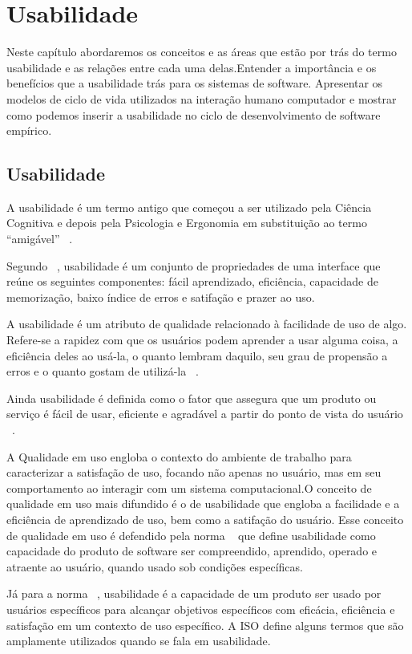 \chapter{Usabilidade}

	Neste capítulo abordaremos os conceitos e as áreas que estão por trás do termo usabilidade e as relações entre cada uma delas.Entender a importância e os benefícios que a usabilidade trás para os sistemas de software. Apresentar os modelos de ciclo de vida utilizados na interação humano computador e mostrar como podemos inserir a usabilidade no ciclo de desenvolvimento de software empírico.

\section {Usabilidade}

	A usabilidade é um termo antigo que começou a ser utilizado pela Ciência Cognitiva e depois pela Psicologia e Ergonomia em substituição ao termo “amigável” ~\cite{dias2006}.
	
	Segundo ~, usabilidade é um conjunto de propriedades de uma interface que reúne os seguintes componentes: fácil aprendizado, eficiência, capacidade de memorização, baixo índice de erros e satifação e prazer ao uso.

	A usabilidade é um atributo de qualidade relacionado à facilidade de uso de algo. Refere-se a rapidez com que os usuários podem aprender a usar alguma coisa, a eficiência deles ao usá-la, o quanto lembram daquilo, seu grau de propensão a erros e o quanto gostam de utilizá-la ~\cite{nielsen2007}. 
	
	Ainda usabilidade é definida como o fator que assegura que um produto ou serviço é fácil de usar, eficiente e agradável a partir do ponto de vista do usuário ~\cite{preece2007}.
	
	A Qualidade em uso engloba o contexto do ambiente de trabalho para caracterizar a satisfação de uso, focando não apenas no usuário, mas em seu comportamento ao interagir com um sistema computacional.O conceito de qualidade em uso mais difundido é o de usabilidade que engloba a facilidade e a eficiência de aprendizado de uso, bem como a satifação do usuário. Esse conceito de qualidade em uso é defendido pela norma ~ que define usabilidade como  capacidade do produto de software ser compreendido, aprendido, operado e atraente ao usuário, quando usado sob condições específicas.
	
	Já para a norma ~, usabilidade é a capacidade de um produto ser usado por usuários específicos para alcançar objetivos específicos com eficácia, eficiência e satisfação em um contexto de uso específico. A ISO define alguns termos que são amplamente utilizados quando se fala em usabilidade.

